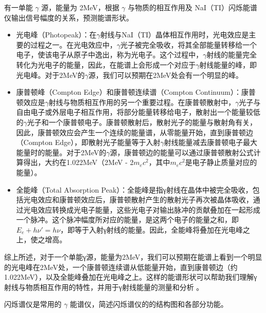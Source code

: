 \documentclass[dvipsnames, svgnames,a4paper,11pt]{article}
\begin{document}
	




\begin{question}
	有一单能 $\gamma$ 源，能量为 2MeV，根据 $\gamma$ 与物质的相互作用及 NaI（TI）闪烁能谱仪输出信号幅度的关系，预测能谱形状。
\end{question}

	\begin{itemize}
		\item 光电峰（Photopeak）：在$\gamma$射线与NaI（TI）晶体相互作用时，光电效应是主要的过程之一。在光电效应中，$\gamma$光子被完全吸收，将其全部能量转移给一个电子，使该电子从原子中逸出，称为光电子。这个过程中，$\gamma$射线的能量完全转化为光电子的能量，因此，在能谱上会形成一个对应于$\gamma$射线能量的峰，即光电峰。对于2MeV的$\gamma$源，我们可以预期在2MeV处会有一个明显的峰。
		\item 康普顿峰（Compton Edge）和康普顿连续谱（Compton Continuum）：康普顿效应是$\gamma$射线与物质相互作用的另一个重要过程。在康普顿散射中，$\gamma$光子与自由电子或外层电子相互作用，将部分能量转移给电子，散射出一个能量较低的$\gamma$光子和一个康普顿电子。康普顿散射后，散射光子的能量与散射角有关，因此，康普顿效应会产生一个连续的能量谱，从零能量开始，直到康普顿边（Compton Edge），即散射光子能量等于入射$\gamma$射线能量减去康普顿电子最大能量时的能量。对于2MeV的$\gamma$源，康普顿边的能量可以通过康普顿散射公式计算得出，大约在1.022MeV（2MeV - 2$m_ec^2$，其中$m_ec^2$是电子静止质量对应的能量）。
		\item 全能峰（Total Absorption Peak）：全能峰是指γ射线在晶体中被完全吸收，包括光电效应和康普顿效应后，康普顿散射产生的散射光子再次被晶体吸收，通过光电效应转换成光电子能量，这些光电子对输出脉冲的贡献叠加在一起形成一个脉冲。这个脉冲幅度所对应的能量，是这两个电子的能量之和，即$E_e + h \nu' = h \nu$，即等于入射γ射线的能量。因此，全能峰将叠加在光电峰之上，使之增高。
	\end{itemize}
	

	综上所述，对于一个单能γ源，能量为2MeV，我们可以预期在能谱上看到一个明显的光电峰在2MeV处，一个康普顿连续谱从低能量开始，直到康普顿边（约1.022MeV），以及全能峰叠加在光电峰之上。这样的能谱形状可以帮助我们理解γ射线与物质相互作用的特性，并用于γ射线能量的测量和分析
。







\begin{question}
	闪烁谱仪是常用的 $\gamma$ 能谱仪，简述闪烁谱仪的的结构图和各部分功能。
\end{question}
\end{document}
